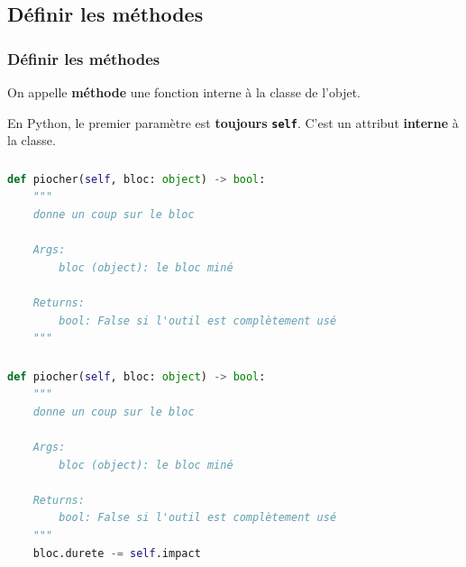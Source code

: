 \documentclass[svgnames,11pt]{beamer}
\begin{document}
\subsection{Définir les méthodes}
\begin{frame}
    \frametitle{Définir les méthodes}

    On appelle \textbf{méthode} une fonction interne à la classe de l'objet. 

    En Python, le premier paramètre est \textbf{toujours} \textbf{\texttt{self}}. C'est un attribut \textbf{interne} à la classe.
\end{frame}
\begin{frame}[fragile]
    \frametitle{}

    \begin{center}
    \begin{lstlisting}[language=Python , basicstyle=\small, xleftmargin=2em, xrightmargin=2em]
def piocher(self, bloc: object) -> bool:
    """
    donne un coup sur le bloc

    Args:
        bloc (object): le bloc miné

    Returns:
        bool: False si l'outil est complètement usé
    """
\end{lstlisting}
    \label{CODE}
    \end{center}

\end{frame}
\begin{frame}[fragile]
    \frametitle{}

    \begin{center}
    \begin{lstlisting}[language=Python , basicstyle=\small, xleftmargin=2em, xrightmargin=2em]
def piocher(self, bloc: object) -> bool:
    """
    donne un coup sur le bloc

    Args:
        bloc (object): le bloc miné

    Returns:
        bool: False si l'outil est complètement usé
    """
    bloc.durete -= self.impact
\end{lstlisting}
    \label{CODE}
    \end{center}

\end{frame}
\end{document}
